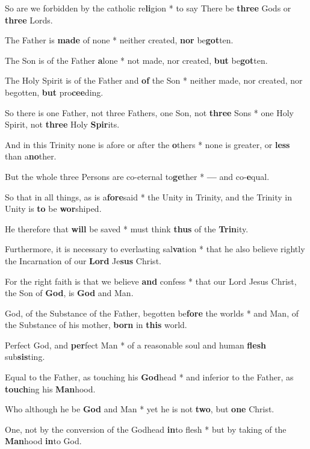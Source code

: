 \begin{multicols}{2}
	So are we forbidden by the catholic re\textbf{li}gion * to say There be \textbf{three} Gods or \textbf{three} Lords. 
	
	The Father is \textbf{made} of none * neither created, \textbf{nor} be\textbf{got}ten.
	
	The Son is of the Father \textbf{a}lone * not made, nor created, \textbf{but} be\textbf{got}ten.
	
	The Holy Spirit is of the Father and \textbf{of} the Son * neither made, nor created, nor begotten, \textbf{but} pro\textbf{cee}ding.
	
	So there is one Father, not three Fathers, one Son, not \textbf{three} Sons * one Holy Spirit, not \textbf{three} Holy \textbf{Spir}its.
	
	And in this Trinity none is afore or after the \textbf{o}thers * none is greater, or \textbf{less} than a\textbf{no}ther.
	
	But the whole three Persons are co-eternal to\textbf{ge}ther * \textbf{---} and co-\textbf{e}qual.
	
	So that in all things, as is a\textbf{fore}said * the Unity in Trinity, and the Trinity in Unity is \textbf{to} be \textbf{wor}shiped.
	
	He therefore that \textbf{will} be saved * must think \textbf{thus} of the \textbf{Trin}ity.
	
	Furthermore, it is necessary to everlasting sal\textbf{va}tion * that he also believe rightly the Incarnation of our \textbf{Lord} Je\textbf{sus} Christ.
	
	For the right faith is that we believe \textbf{and} confess * that our Lord Jesus Christ, the Son of \textbf{God}, is \textbf{God} and Man.
	
	God, of the Substance of the Father, begotten be\textbf{fore} the worlds * and Man, of the Substance of his mother, \textbf{born} in \textbf{this} world.
	
	Perfect God, and \textbf{per}fect Man * of a reasonable soul and human \textbf{flesh} sub\textbf{sis}ting.
	
	Equal to the Father, as touching his \textbf{God}head * and inferior to the Father, as \textbf{touch}ing his \textbf{Man}hood.
	
	Who although he be \textbf{God} and Man * yet he is not \textbf{two}, but \textbf{one} Christ.
	
	One, not by the conversion of the Godhead \textbf{in}to flesh * but by taking of the \textbf{Man}hood \textbf{in}to God.
	

\end{multicols}

